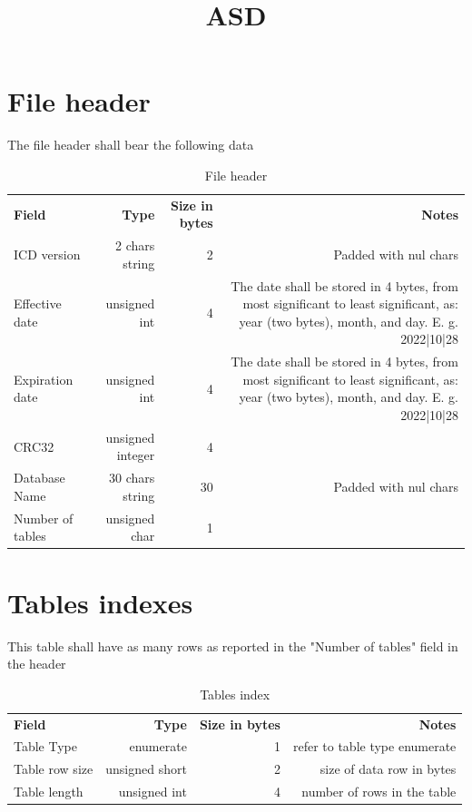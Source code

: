 \documentclass{article}
\title{ASD}
\newcommand\strpad{Padded with nul chars}
\newcommand\DateType{The date shall be stored in 4 bytes, from most significant to least significant, as: year (two bytes), month, and day. E. g. 2022|10|28}
\begin{document}
\section{File header}
The file header shall bear the following data
\begin{table}[H]
   \caption{File header} 
   \label{tab:HEADER}
   \small
   \begin{tabular}{|l|r|r|r|}
   \textbf{Field} & \textbf{Type} & \textbf{Size in bytes} & \textbf{Notes} \\ 
   ICD version & 2 chars string & 2 & \strpad\\
   Effective date & unsigned int & 4 & \DateType \\
   Expiration date & unsigned int & 4 & \DateType \\
   CRC32 & unsigned integer & 4& \\
   Database Name & 30 chars string & 30 & \strpad\\
   Number of tables & unsigned char & 1 & \\
   \end{tabular}
\end{table}
\section{Tables indexes}
This table shall have as many rows as reported in the "Number of tables" field in the header
\begin{table}[H]
   \caption{Tables index} 
   \label{tab:TAB_INDEXES}
   \small
   \begin{tabular}{|l|r|r|r|}
   \textbf{Field} & \textbf{Type} & \textbf{Size in bytes} & \textbf{Notes} \\ 
   Table Type & enumerate & 1 & refer to table type enumerate\\
   Table row size & unsigned short & 2 & size of data row in bytes \\
   Table length & unsigned int & 4 & number of rows in the table\\
   \end{tabular}
\end{table}
\end{document}

